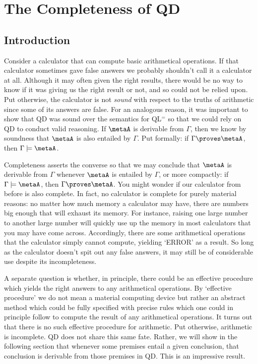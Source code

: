 ﻿%
\chapter{The Completeness of QD}
\label{ch.FOL-complete}

\section{Introduction}
  \label{sec:Introduction}

Consider a calculator that can compute basic arithmetical operations.
If that calculator sometimes gave false answers we probably shouldn't call it a calculator at all.
Although it may often given the right results, there would be no way to know if it was giving us the right result or not, and so could not be relied upon.
Put otherwise, the calculator is not \textit{sound} with respect to the truths of arithmetic since some of its answers are false.
For an analogous reason, it was important to show that QD was sound over the semantics for QL$^=$ so that we could rely on QD to conduct valid reasoning.
If $\metaA$ is derivable from $\Gamma$, then we know by soundness that $\metaA$ is also entailed by $\Gamma$.
Put formally: if $\Gamma\proves\metaA$, then $\Gamma\models\metaA$.

Completeness asserts the converse so that we may conclude that $\metaA$ is derivable from $\Gamma$ whenever $\metaA$ is entailed by $\Gamma$, or more compactly: if $\Gamma\models\metaA$, then $\Gamma\proves\metaA$.
You might wonder if our calculator from before is also complete.
In fact, no calculator is complete for purely material reasons: no matter how much memory a calculator may have, there are numbers big enough that will exhaust its memory.
For instance, raising one large number to another large number will quickly use up the memory in most calculators that you may have come across.
Accordingly, there are some arithmetical operations that the calculator simply cannot compute, yielding `ERROR' as a result.
So long as the calculator doesn't spit out any false answers, it may still be of considerable use despite its incompleteness.

A separate question is whether, in principle, there could be an effective procedure which yields the right answers to any arithmetical operations.
By `effective procedure' we do not mean a material computing device but rather an abstract method which could be fully specified with precise rules which one could in principle follow to compute the result of any arithmetical operations.
It turns out that there is no such effective procedure for arithmetic.
Put otherwise, arithmetic is incomplete.
QD does not share this same fate.
Rather, we will show in the following section that whenever some premises entail a given conclusion, that conclusion is derivable from those premises in QD.
This is an impressive result.

